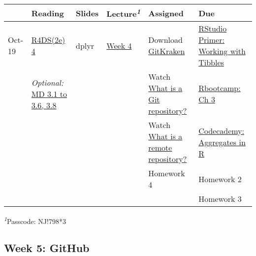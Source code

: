 \documentclass[
  letterpaper,
  DIV=11,
  numbers=noendperiod]{scrartcl}
\begin{document}
\setlength{\LTpost}{0mm}
\begin{longtable*}{llllll}
\toprule
 & Reading & Slides & Lecture\textsuperscript{\textit{1}} & Assigned & Due \\ 
\midrule\addlinespace[2.5pt]
Oct-19 & \href{https://r4ds.hadley.nz/data-transform}{R4DS(2e) 4} & {dplyr} & \href{https://uoregon.zoom.us/rec/share/nqlBls8TSLTqABAqpFFR32RRticIY2kmOrKBmW63s1Z7CFpprUwFyoZYCf6qiYhO.xG2LvSEmL3lDnHch}{Week 4} & Download \href{https://www.gitkraken.com/}{GitKraken} & \href{https://posit.cloud/learn/primers/2.1}{RStudio Primer: Working with Tibbles} \\ 
 & \emph{Optional:} \href{https://moderndive.com/3-wrangling.html}{MD 3.1 to 3.6, 3.8} &  &  & Watch \href{https://www.youtube.com/watch?v=A-4WltCTVms\&list=PLe6EXFvnTV7-_41SpakZoTIYCgX4aMTdU\&index=3}{What is a Git repository?} & \href{https://r-bootcamp.netlify.app/chapter3}{Rbootcamp: Ch 3} \\ 
 &  &  &  & Watch \href{https://www.youtube.com/watch?v=Lb4yvfrX_7I\&list=PLe6EXFvnTV7-_41SpakZoTIYCgX4aMTdU\&index=3}{What is a remote repository?} & \href{https://www.codecademy.com/courses/learn-r/lessons/r-aggregates/exercises/introduction}{Codecademy: Aggregates in R} \\ 
 &  &  &  & Homework 4 & Homework 2 \\ 
 &  &  &  &  & Homework 3 \\ 
\bottomrule
\end{longtable*}
\begin{minipage}{\linewidth}
\textsuperscript{\textit{1}}Passcode: NJ!798*3\\
\end{minipage}

\hypertarget{week-5-github}{%
\subsection{Week 5: GitHub}\label{week-5-github}}
\end{document}
